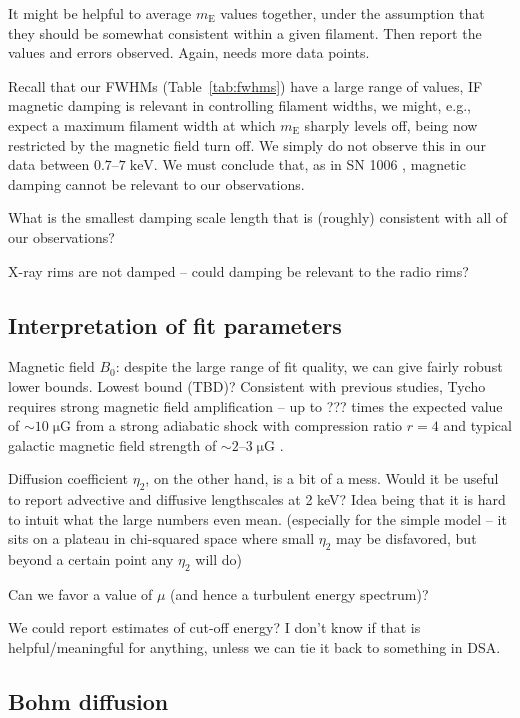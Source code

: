 \documentclass[iop, apj, numberedappendix, twocolappendix]{emulateapj}
\newcommand*{\mt}{\mathrm}
\newcommand*{\unit}[1]{\;\mt{#1}}  %
\newcommand*{\abt}{\mathord{\sim}} %
\newcommand*{\mE}{m_\mt{E}}
\begin{document}
It might be helpful to average $\mE$ values together, under the
assumption that they should be somewhat consistent within a given filament.
Then report the values and errors observed.  Again, needs more data points.

Recall that our FWHMs (Table~\ref{tab:fwhms}) have a large range of values,
IF magnetic damping is relevant in controlling filament widths, we might, e.g.,
expect a maximum filament width at which $\mE$ sharply levels off, being now
restricted by the magnetic field turn off.  We simply do not observe this in
our data between $0.7$--$7 \unit{keV}$.  We must conclude that, as in SN 1006
, magnetic damping cannot be relevant to our
observations.

What is the smallest damping scale length that is (roughly) consistent with all
of our observations?

X-ray rims are not damped -- could damping be relevant to the radio rims?

\subsection{Interpretation of fit parameters}

Magnetic field $B_0$: despite the large range of fit quality, we can give
fairly robust lower bounds.  Lowest bound (TBD)?  Consistent with previous
studies, Tycho requires strong magnetic field amplification -- up to ??? times
the expected value of $\abt 10 \unit{\mu G}$ from a strong adiabatic shock with
compression ratio $r=4$ and typical galactic magnetic field strength of $\abt
2$--$3 \unit{\mu G}$ \citep{lyne1989, han2006}.

Diffusion coefficient $\eta_2$, on the other hand, is a bit of a mess.
Would it be useful to report advective and diffusive lengthscales at 2 keV?
Idea being that it is hard to intuit what the large numbers even mean.
(especially for the simple model -- it sits on a plateau in chi-squared space
where small $\eta_2$ may be disfavored, but beyond a certain point any $\eta_2$
will do)

Can we favor a value of $\mu$ (and hence a turbulent energy spectrum)?

We could report estimates of cut-off energy?  I don't know if that is
helpful/meaningful for anything, unless we can tie it back to something in DSA.

\subsection{Bohm diffusion}
\end{document}
